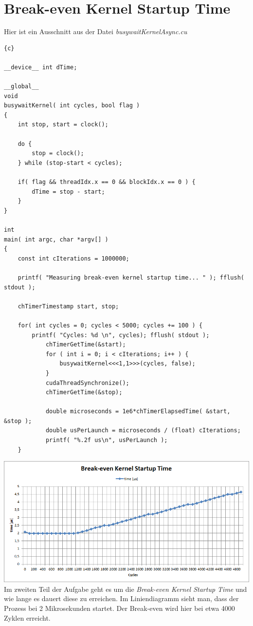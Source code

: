 \documentclass{article}
\newcommand{\enterProblemHeader}[1]{
}
\newcommand{\exitProblemHeader}[1]{
}
\newcounter{homeworkProblemCounter} %
\newcommand{\homeworkProblemName}{}
\newenvironment{homeworkProblem}[1][Problem \arabic{homeworkProblemCounter}]{ %
\stepcounter{homeworkProblemCounter} %
\renewcommand{\homeworkProblemName}{#1} %
\section{\homeworkProblemName} %
}{
}
\begin{document}
\begin{homeworkProblem}[Break-even Kernel Startup Time]
Hier ist ein Ausschnitt aus der Datei \textit{busywaitKernelAsync.cu}
\begin{lstlisting}{c}

__device__ int dTime;

__global__
void
busywaitKernel( int cycles, bool flag )
{
	int stop, start = clock();

	do {
		stop = clock();
	} while (stop-start < cycles);
	
	if( flag && threadIdx.x == 0 && blockIdx.x == 0 ) {
		dTime = stop - start;
	}
}

int
main( int argc, char *argv[] )
{
	const int cIterations = 1000000; 
		
    printf( "Measuring break-even kernel startup time... " ); fflush( stdout );

    chTimerTimestamp start, stop;
	
	for( int cycles = 0; cycles < 5000; cycles += 100 ) {
		printf( "Cycles: %d \n", cycles); fflush( stdout );		
    		chTimerGetTime(&start);
    		for ( int i = 0; i < cIterations; i++ ) {
        		busywaitKernel<<<1,1>>>(cycles, false);
    		}
    		cudaThreadSynchronize();
    		chTimerGetTime(&stop);	

        	double microseconds = 1e6*chTimerElapsedTime( &start, &stop );
        	double usPerLaunch = microseconds / (float) cIterations;
        	printf( "%.2f us\n", usPerLaunch );
   	}
\end{lstlisting}

\includegraphics[width=\textwidth]{break-even.png}
\\
Im zweiten Teil der Aufgabe geht es um die \textit{Break-even Kernel Startup Time} und wie lange es dauert diese zu erreichen. Im Liniendiagramm sieht man, dass der Prozess bei 2 Mikrosekunden startet. Der Break-even wird hier bei etwa 4000 Zyklen erreicht. 

\end{homeworkProblem}
\end{document}
